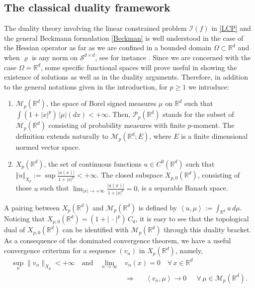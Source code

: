 \documentclass[11pt,letterpaper,reqno]{amsart}
\theoremstyle{definition}
\numberwithin{equation}{section}
\newcommand{\R}{\mathbb{R}}
\newcommand{\Rd}{\R^d}
\def\O{\Omega}
\newcommand{\argu}{{\,\cdot\,}}
\newcommand{\Mes}{{\mathcal{M}}}
\newcommand{\PP}{\mathcal{P}}
\newcommand{\pairing}[1]{{\left \langle #1 \right \rangle}}
\newcommand{\I}{\mathcal{I}}
\newcommand{\C}{{C}}
\newcommand{\Sdd}{{\mathcal{S}^{d \times d}}}
\begin{document}
\subsection{The classical duality framework}\label{dualclassic}  The duality theory involving  the linear constrained problem $\I(f)$ in \eqref{LCP}
and the general Beckmann formulation \eqref{Beckman}
is well understood in the case of the Hessian operator as far as we are confined in a bounded domain  $\O \subset \R^d$ and when $\varrho$ is any norm on $\Sdd$, see for instance \cite{bouchitte2007}. Since we are  concerned with the case $\O=\R^d$, some specific  functional spaces will prove useful in showing the existence  of solutions as well as  in the duality arguments.
Therefore, in addition to the general notations  given in the introduction, for $p\ge 1$ we introduce:
\begin{enumerate}[leftmargin=1.2\parindent]

\medskip
\item [-]  $\Mes_p(\Rd)$, the space of Borel signed  measures $\mu$ on $\R^d$ such that
 $\int (1+|x|^p) \, |\mu|(dx)<+\infty$. Then, $\PP_p(\R^d)$ stands for the subset of $\Mes_p(\R^d)$ consisting of probability measures with finite $p$-moment. The definition extends naturally to $\Mes_p(\Rd;E)$, where $E$ is a finite dimensional normed vector space.

\medskip
\item [-] $X_p(\R^d)$, the set of continuous functions $u\in \C^0(\R^d)$ such that 
$\Vert u\Vert_{X_p}:= \sup \frac{|u(x)|}{1+ |x|^p}<+\infty$.
The closed subspace $X_{p,0}(\Rd)$, consisting of those $u$ such that $\lim_{|x|\to+\infty} \frac{|u(x)|}{1+ |x|^p}=0$, is a separable
Banach space.

\end{enumerate}
A pairing  between $X_p(\R^d)$ and $\Mes_p(\Rd)$ is defined by $\pairing{u, \mu}:= \int_{\Rd} u\, d\mu$.
Noticing that  {$X_{p,0}(\Rd) = {(1+ |\argu|^p)}\, \C_0$},  it is easy to see  that the topological dual of $X_{p,0}(\Rd)$ can be identified with  $\Mes_p(\Rd)$ through this duality bracket. 
As a consequence of the dominated convergence theorem, we have a useful  convergence criterium for a sequence $(v_n)$ in $X_p(\R^d)$, namely,
\begin{align}\label{domiCV}
\sup_n \| v_n\|_{X_p} <+\infty \quad \text{and}\quad \lim_{n\to \infty} & v_n(x) =0 \quad \forall \,x\in\R^d \\
\nonumber
 &\Rightarrow \quad \ \ \pairing{v_n,\mu}  \to 0 \quad \ \ 
 \forall\, \mu\in\Mes_p(\R^d) .
\end{align}
\end{document}
